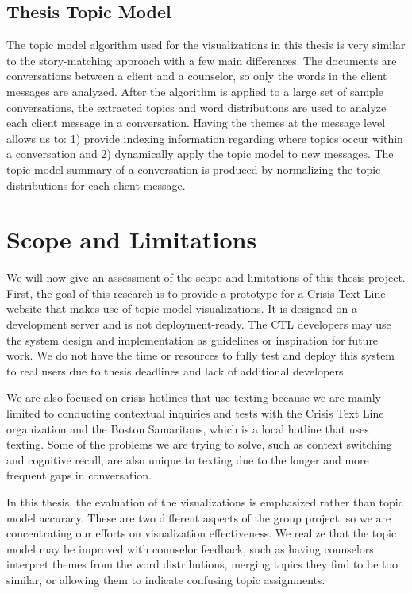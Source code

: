 \subsection{Thesis Topic Model}

The topic model algorithm used for the visualizations in this thesis is very similar to the story-matching approach with a few main differences. The documents are conversations between a client and a counselor, so only the words in the client messages are analyzed. After the algorithm is applied to a large set of sample conversations, the extracted topics and word distributions are used to analyze each client message in a conversation. Having the themes at the message level allows us to: 1) provide indexing information regarding where topics occur within a conversation and 2) dynamically apply the topic model to new messages. The topic model summary of a conversation is produced by normalizing the topic distributions for each client message.

\section{Scope and Limitations}

We will now give an assessment of the scope and limitations of this thesis project. First, the goal of this research is to provide a prototype for a Crisis Text Line website that makes use of topic model visualizations. It is designed on a development server and is not deployment-ready. The CTL developers may use the system design and implementation as guidelines or inspiration for future work. We do not have the time or resources to fully test and deploy this system to real users due to thesis deadlines and lack of additional developers.

We are also focused on crisis hotlines that use texting because we are mainly limited to conducting contextual inquiries and tests with the Crisis Text Line organization and the Boston Samaritans, which is a local hotline that uses texting. Some of the problems we are trying to solve, such as context switching and cognitive recall, are also unique to texting due to the longer and more frequent gaps in conversation.

In this thesis, the evaluation of the visualizations is emphasized rather than topic model accuracy. These are two different aspects of the group project, so we are concentrating our efforts on visualization effectiveness. We realize that the topic model may be improved with counselor feedback, such as having counselors interpret themes from the word distributions, merging topics they find to be too similar, or allowing them to indicate confusing topic assignments.

